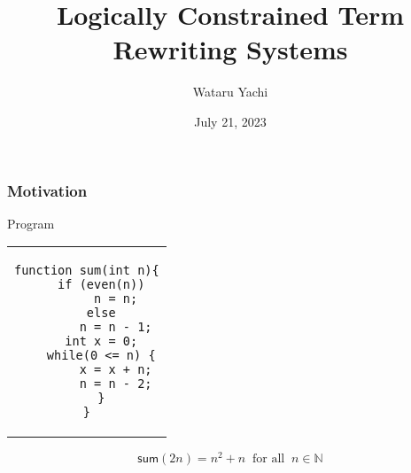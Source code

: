 \documentclass[12pt,aspectratio=169]{beamer}
\title{ Logically Constrained Term Rewriting Systems }
\author{Wataru Yachi}
\institute{JAIST}
\date{July 21, 2023}
\newcommand{\m}[1]{\mathsf{#1}}
\begin{document}
\maketitle

\begin{comment}
\begin{frame}
    \frametitle{If Treat Integers in Rules}

    \begin{example}
        for every $n,m,k \in \mathbb{Z}$
        \begin{tabular}{lcl}
            $\m{add}(\m{m}, \m{n}) \to k$ & if & $k = m + n$ \\
            $\m{even}(\m{n}) \to \m{true}$  & if & $n$ is even number\\
            $\m{even}(\m{n}) \to \m{false}$ & if & $n$ is not even number
            \end{tabular}
    \end{example}
\end{frame}
\end{comment}

\begin{frame}[fragile]
    \frametitle{Motivation}

    Program
\begin{center}
\begin{tabular}{c}
\begin{lstlisting}
function sum(int n){
    if (even(n))
        n = n;
    else
        n = n - 1;
    int x = 0;
    while(0 <= n) {
        x = x + n;
        n = n - 2;
    }
}
\end{lstlisting}
\end{tabular}
\end{center}
\pause
    \[
        \m{sum}(2n) = n^2 + n \;\; \text{for all} \;\; n \in \mathbb{N}
    \]
\end{frame}
\end{document}
